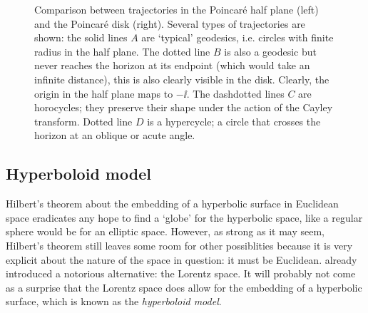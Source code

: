 \begin{figure}[ht]
    \centering
    
    \label{fig:halfplane_disk}
    \caption{Comparison between trajectories in the Poincaré half plane (left) and the Poincaré disk (right). Several types of trajectories are shown: the solid lines \(A\) are `typical' geodesics, i.e. circles with finite radius in the half plane. The dotted line \(B\) is also a geodesic but never reaches the horizon at its endpoint (which would take an infinite distance), this is also clearly visible in the disk. Clearly, the origin in the half plane maps to \(-\ii\). The dashdotted lines \(C\) are horocycles; they preserve their shape under the action of the Cayley transform. Dotted line \(D\) is a hypercycle; a circle that crosses the horizon at an oblique or acute angle.}
\end{figure}

\subsection{Hyperboloid model}
Hilbert's theorem about the embedding of a hyperbolic surface in Euclidean space eradicates any hope to find a `globe' for the hyperbolic space, like a regular sphere would be for an elliptic space. However, as strong as it may seem, Hilbert's theorem still leaves some room for other possiblities because it is very explicit about the nature of the space in question: it must be Euclidean.  already introduced a notorious alternative: the Lorentz space. It will probably not come as a surprise that the Lorentz space does allow for the embedding of a hyperbolic surface, which is known as the \emph{hyperboloid model}.

